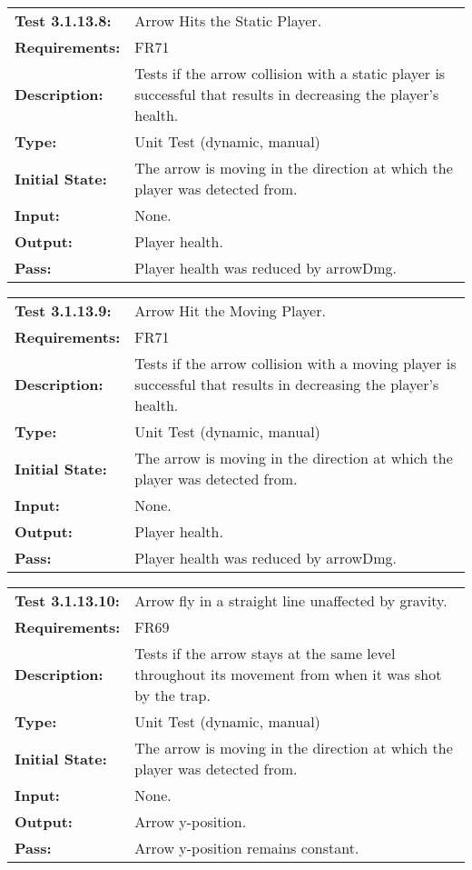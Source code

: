 \documentclass[12pt, titlepage]{article}
\begin{document}
\begin{tabular}{|l|p{10cm}|}
    \hline
    \bf{Test} 3.1.13.8: & Arrow Hits the Static Player.\\
    \bf{Requirements}: & FR71\\
    \bf{Description}: & Tests if the arrow collision with a static player is successful that results in decreasing the player's health. \\
    \bf{Type}: & Unit Test (dynamic, manual) \\
    \bf{Initial State}: & The arrow is moving in the direction at which the player was detected from. \\
    \bf{Input}: &None. \\
    \bf{Output}: & Player health.\\
    \bf{Pass}: & Player health was reduced by arrowDmg.\\
    \hline
\end{tabular}

\begin{tabular}{|l|p{10cm}|}
    \hline
    \bf{Test} 3.1.13.9: & Arrow Hit the Moving Player.\\
    \bf{Requirements}: & FR71\\
    \bf{Description}: & Tests if the arrow collision with a moving player is successful that results in decreasing the player's health. \\
    \bf{Type}: & Unit Test (dynamic, manual) \\
    \bf{Initial State}: & The arrow is moving in the direction at which the player was detected from. \\
    \bf{Input}: & None.\\
    \bf{Output}: & Player health.\\
    \bf{Pass}: & Player health was reduced by arrowDmg.\\
    \hline
\end{tabular}

\begin{tabular}{|l|p{10cm}|}
    \hline
    \bf{Test} 3.1.13.10: & Arrow fly in a straight line unaffected by gravity.\\
    \bf{Requirements}: & FR69\\
    \bf{Description}: & Tests if the arrow stays at the same level throughout its movement from when it was shot by the trap. \\
    \bf{Type}: & Unit Test (dynamic, manual) \\
    \bf{Initial State}: & The arrow is moving in the direction at which the player was detected from. \\
    \bf{Input}: & None.\\
    \bf{Output}: & Arrow y-position.\\
    \bf{Pass}: & Arrow y-position remains constant.\\
    \hline
\end{tabular}
\end{document}
